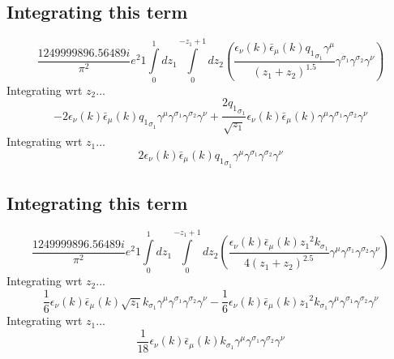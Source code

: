\subsection*{Integrating this term}
\begin{dmath}\frac{1249999896.56489 i}{\pi^{2}} e^{2}1\int\limits_{ 0 }^{ 1 } d{ z_{ 1 } }\int\limits_{ 0 }^{ - { z_{ 1 } } + 1 } d{ z_{ 2 } }\left(\frac{\epsilon_{ \nu }({ k }) \bar{\epsilon}_{ \mu }({ k }) { { q_1 }_{ \sigma_1 } } { \gamma^{ \mu } }}{\left({ z_{ 1 } } + { z_{ 2 } }\right)^{1.5}} { \gamma^{ \sigma_1 } } { \gamma^{ \sigma_2 } } { \gamma^{ \nu } }\right)\end{dmath}
Integrating wrt ${ z_{ 2 } }$...
\begin{dmath}- 2 \epsilon_{ \nu }({ k }) \bar{\epsilon}_{ \mu }({ k }) { { q_1 }_{ \sigma_1 } } { \gamma^{ \mu } } { \gamma^{ \sigma_1 } } { \gamma^{ \sigma_2 } } { \gamma^{ \nu } } + \frac{2 { { q_1 }_{ \sigma_1 } }}{\sqrt{{ z_{ 1 } }}} \epsilon_{ \nu }({ k }) \bar{\epsilon}_{ \mu }({ k }) { \gamma^{ \mu } } { \gamma^{ \sigma_1 } } { \gamma^{ \sigma_2 } } { \gamma^{ \nu } }\end{dmath}
Integrating wrt ${ z_{ 1 } }$...
\begin{dmath}2 \epsilon_{ \nu }({ k }) \bar{\epsilon}_{ \mu }({ k }) { { q_1 }_{ \sigma_1 } } { \gamma^{ \mu } } { \gamma^{ \sigma_1 } } { \gamma^{ \sigma_2 } } { \gamma^{ \nu } }\end{dmath}
\subsection*{Integrating this term}
\begin{dmath}\frac{1249999896.56489 i}{\pi^{2}} e^{2}1\int\limits_{ 0 }^{ 1 } d{ z_{ 1 } }\int\limits_{ 0 }^{ - { z_{ 1 } } + 1 } d{ z_{ 2 } }\left(\frac{\epsilon_{ \nu }({ k }) \bar{\epsilon}_{ \mu }({ k }) { z_{ 1 } }^{2} { { k }_{ \sigma_1 } }}{4 \left({ z_{ 1 } } + { z_{ 2 } }\right)^{2.5}} { \gamma^{ \mu } } { \gamma^{ \sigma_1 } } { \gamma^{ \sigma_2 } } { \gamma^{ \nu } }\right)\end{dmath}
Integrating wrt ${ z_{ 2 } }$...
\begin{dmath}\frac{1}{6} \epsilon_{ \nu }({ k }) \bar{\epsilon}_{ \mu }({ k }) \sqrt{{ z_{ 1 } }} { { k }_{ \sigma_1 } } { \gamma^{ \mu } } { \gamma^{ \sigma_1 } } { \gamma^{ \sigma_2 } } { \gamma^{ \nu } } - \frac{1}{6} \epsilon_{ \nu }({ k }) \bar{\epsilon}_{ \mu }({ k }) { z_{ 1 } }^{2} { { k }_{ \sigma_1 } } { \gamma^{ \mu } } { \gamma^{ \sigma_1 } } { \gamma^{ \sigma_2 } } { \gamma^{ \nu } }\end{dmath}
Integrating wrt ${ z_{ 1 } }$...
\begin{dmath}\frac{1}{18} \epsilon_{ \nu }({ k }) \bar{\epsilon}_{ \mu }({ k }) { { k }_{ \sigma_1 } } { \gamma^{ \mu } } { \gamma^{ \sigma_1 } } { \gamma^{ \sigma_2 } } { \gamma^{ \nu } }\end{dmath}
